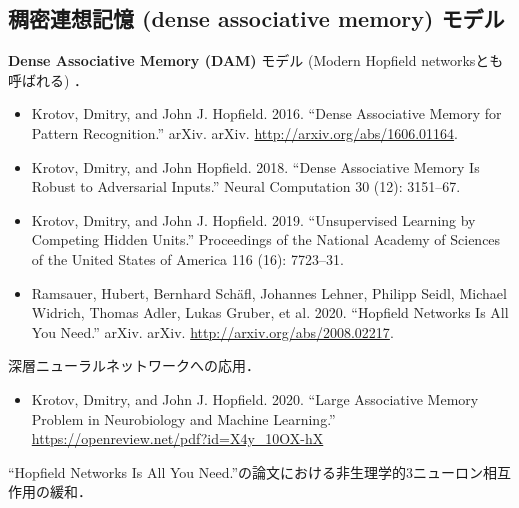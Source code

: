 \subsection{稠密連想記憶 (dense associative memory) モデル}
\textbf{Dense Associative Memory (DAM)} モデル (Modern Hopfield networksとも呼ばれる) ．

\begin{itemize}
\item Krotov, Dmitry, and John J. Hopfield. 2016. “Dense Associative Memory for Pattern Recognition.” arXiv. arXiv. \url{http://arxiv.org/abs/1606.01164}.
\item Krotov, Dmitry, and John Hopfield. 2018. “Dense Associative Memory Is Robust to Adversarial Inputs.” Neural Computation 30 (12): 3151–67.
\item Krotov, Dmitry, and John J. Hopfield. 2019. “Unsupervised Learning by Competing Hidden Units.” Proceedings of the National Academy of Sciences of the United States of America 116 (16): 7723–31.
\end{itemize}


\begin{itemize}
\item Ramsauer, Hubert, Bernhard Schäfl, Johannes Lehner, Philipp Seidl, Michael Widrich, Thomas Adler, Lukas Gruber, et al. 2020. “Hopfield Networks Is All You Need.” arXiv. arXiv. \url{http://arxiv.org/abs/2008.02217}.
\end{itemize}

深層ニューラルネットワークへの応用．


\begin{itemize}
\item Krotov, Dmitry, and John J. Hopfield. 2020. “Large Associative Memory Problem in Neurobiology and Machine Learning.” \url{https://openreview.net/pdf?id=X4y_10OX-hX}
\end{itemize}

“Hopfield Networks Is All You Need.”の論文における非生理学的3ニューロン相互作用の緩和．
